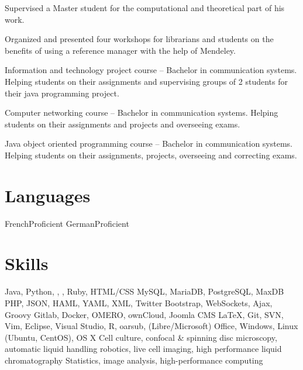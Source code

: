 \documentclass[11pt,a4paper,nolmodern, sans]{moderncv}        %
\def\ifmonospace{\ifdim\fontdimen3\font=0pt }
\def\Cpp{%
\ifmonospace%
    C++%
\else%
    C\kern-.1667em\raise.30ex\hbox{\smaller{++}}%
\fi%
\spacefactor1000 }
\def\Csharp{%
\ifmonospace%
    C\#%
\else%
    C\kern-.1667em\raise.30ex\hbox{\smaller{\#}}%
\fi%
\spacefactor1000 }
\begin{document}
{Supervised a Master student for the computational and theoretical part of his work. }

{Organized and presented four workshops for librarians and students on the benefits of using a reference manager with the help of Mendeley.
}

{Information and technology project course -- Bachelor in communication systems. Helping students on their assignments and supervising groups of 2 students for their java programming project.}

{Computer networking course -- Bachelor in communication systems. Helping students on their assignments and projects and overseeing exams.}

{Java object oriented programming course -- Bachelor in communication systems. Helping students on their assignments, projects, overseeing and correcting exams.}{}


\section{Languages}
  {French}{Proficient}
    {German}{Proficient}


\section{Skills}

    {Java, Python, \Cpp, \Csharp, Ruby, HTML/CSS}
    {MySQL, MariaDB, PostgreSQL, MaxDB}
          {PHP, JSON, HAML, YAML, XML, Twitter Bootstrap, WebSockets, Ajax, Groovy}
    {Gitlab, Docker, OMERO, ownCloud, Joomla CMS}
  {\LaTeX, Git, SVN, Vim, Eclipse, Visual Studio, R, oarsub, (Libre/Microsoft) Office, Windows, Linux (Ubuntu, CentOS), OS X}
   {Cell culture, confocal \& spinning disc microscopy, automatic liquid handling robotics, live cell imaging, high performance liquid chromatography}
   {Statistics, image analysis, high-performance computing}
\end{document}

